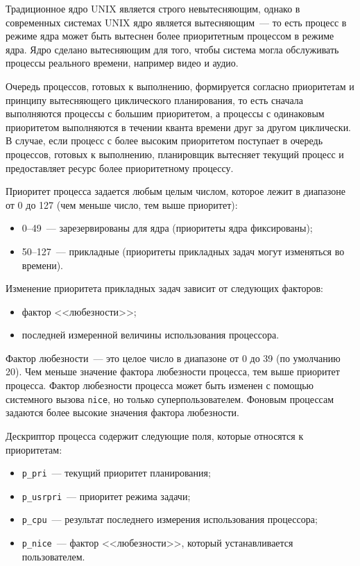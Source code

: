 \documentclass[14pt]{extarticle}
\begin{document}
Традиционное ядро UNIX является строго невытесняющим, однако в современных
системах UNIX ядро является вытесняющим~--- то есть процесс в режиме ядра может
быть вытеснен более приоритетным процессом в режиме ядра. Ядро сделано
вытесняющим для того, чтобы система могла обслуживать процессы реального
времени, например видео и аудио.

Очередь процессов, готовых к выполнению, формируется согласно приоритетам и
принципу вытесняющего циклического планирования, то есть сначала выполняются
процессы с большим приоритетом, а процессы с одинаковым приоритетом выполняются
в течении кванта времени друг за другом циклически. В случае, если процесс с
более высоким приоритетом поступает в очередь процессов, готовых к выполнению,
планировщик вытесняет текущий процесс и предоставляет ресурс более
приоритетному процессу.

Приоритет процесса задается любым целым числом, которое лежит в диапазоне от 0
до 127 (чем меньше число, тем выше приоритет):
\begin{itemize}
    \item 0--49~--- зарезервированы для ядра (приоритеты ядра фиксированы);
    \item 50--127~--- прикладные (приоритеты прикладных задач могут изменяться
        во времени).
\end{itemize}

Изменение приоритета прикладных задач зависит от следующих факторов:
\begin{itemize}
    \item фактор <<любезности>>;
    \item последней измеренной величины использования процессора.
\end{itemize}

Фактор любезности~--- это целое число в диапазоне от 0 до 39 (по умолчанию 20).
Чем меньше значение фактора любезности процесса, тем выше приоритет процесса.
Фактор любезности процесса может быть изменен с помощью системного вызова
\texttt{nice}, но только суперпользователем. Фоновым процессам задаются более
высокие значения фактора любезности.

Дескриптор процесса содержит следующие поля, которые относятся к приоритетам:
\begin{itemize}
    \item \texttt{p\_pri}~--- текущий приоритет планирования;
    \item \texttt{p\_usrpri}~--- приоритет режима задачи;
    \item \texttt{p\_cpu}~--- результат последнего измерения использования
        процессора;
    \item \texttt{p\_nice}~--- фактор <<любезности>>, который устанавливается
        пользователем.
\end{itemize}
\end{document}
